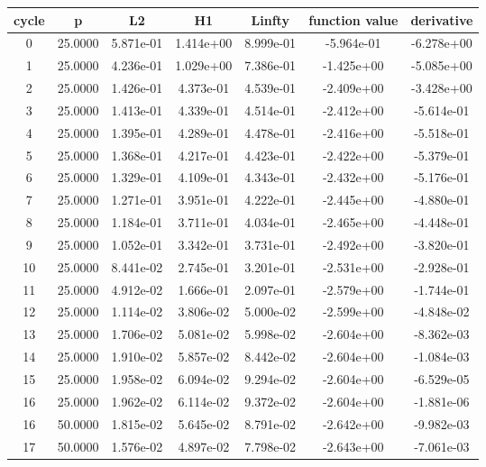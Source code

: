 \documentclass[10pt]{report}
\begin{document}
\begin{table}[H]
\begin{center}
\begin{tabular}{|c|c|c|c|c|c|c|} \hline
cycle & p & L2 & H1 & Linfty & function value & derivative\\ \hline
0 & 25.0000 & 5.871e-01 & 1.414e+00 & 8.999e-01 & -5.964e-01 & -6.278e+00\\ \hline
1 & 25.0000 & 4.236e-01 & 1.029e+00 & 7.386e-01 & -1.425e+00 & -5.085e+00\\ \hline
2 & 25.0000 & 1.426e-01 & 4.373e-01 & 4.539e-01 & -2.409e+00 & -3.428e+00\\ \hline
3 & 25.0000 & 1.413e-01 & 4.339e-01 & 4.514e-01 & -2.412e+00 & -5.614e-01\\ \hline
4 & 25.0000 & 1.395e-01 & 4.289e-01 & 4.478e-01 & -2.416e+00 & -5.518e-01\\ \hline
5 & 25.0000 & 1.368e-01 & 4.217e-01 & 4.423e-01 & -2.422e+00 & -5.379e-01\\ \hline
6 & 25.0000 & 1.329e-01 & 4.109e-01 & 4.343e-01 & -2.432e+00 & -5.176e-01\\ \hline
7 & 25.0000 & 1.271e-01 & 3.951e-01 & 4.222e-01 & -2.445e+00 & -4.880e-01\\ \hline
8 & 25.0000 & 1.184e-01 & 3.711e-01 & 4.034e-01 & -2.465e+00 & -4.448e-01\\ \hline
9 & 25.0000 & 1.052e-01 & 3.342e-01 & 3.731e-01 & -2.492e+00 & -3.820e-01\\ \hline
10 & 25.0000 & 8.441e-02 & 2.745e-01 & 3.201e-01 & -2.531e+00 & -2.928e-01\\ \hline
11 & 25.0000 & 4.912e-02 & 1.666e-01 & 2.097e-01 & -2.579e+00 & -1.744e-01\\ \hline
12 & 25.0000 & 1.114e-02 & 3.806e-02 & 5.000e-02 & -2.599e+00 & -4.848e-02\\ \hline
13 & 25.0000 & 1.706e-02 & 5.081e-02 & 5.998e-02 & -2.604e+00 & -8.362e-03\\ \hline
14 & 25.0000 & 1.910e-02 & 5.857e-02 & 8.442e-02 & -2.604e+00 & -1.084e-03\\ \hline
15 & 25.0000 & 1.958e-02 & 6.094e-02 & 9.294e-02 & -2.604e+00 & -6.529e-05\\ \hline
16 & 25.0000 & 1.962e-02 & 6.114e-02 & 9.372e-02 & -2.604e+00 & -1.881e-06\\ \hline
16 & 50.0000 & 1.815e-02 & 5.645e-02 & 8.791e-02 & -2.642e+00 & -9.982e-03\\ \hline
17 & 50.0000 & 1.576e-02 & 4.897e-02 & 7.798e-02 & -2.643e+00 & -7.061e-03\\ \hline

\end{tabular}
\end{center}
\end{table}
\end{document}
